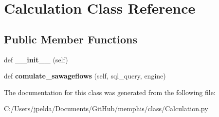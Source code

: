 \hypertarget{class_calculation_1_1_calculation}{}\section{Calculation Class Reference}
\label{class_calculation_1_1_calculation}
\subsection*{Public Member Functions}
\begin{DoxyCompactItemize}
\item 
\mbox{\label{class_calculation_1_1_calculation_ae64f0875afe3067b97ba370b354b9213}} 
def {\bfseries \+\_\+\+\_\+init\+\_\+\+\_\+} (self)
\item 
\mbox{\label{class_calculation_1_1_calculation_a4491717e0d9c55f3d7ff29fbf9f60a37}} 
def {\bfseries comulate\+\_\+sawageflows} (self, sql\+\_\+query, engine)
\end{DoxyCompactItemize}


The documentation for this class was generated from the following file\+:\begin{DoxyCompactItemize}
\item 
C\+:/\+Users/jpelda/\+Documents/\+Git\+Hub/memphis/class/Calculation.\+py\end{DoxyCompactItemize}
